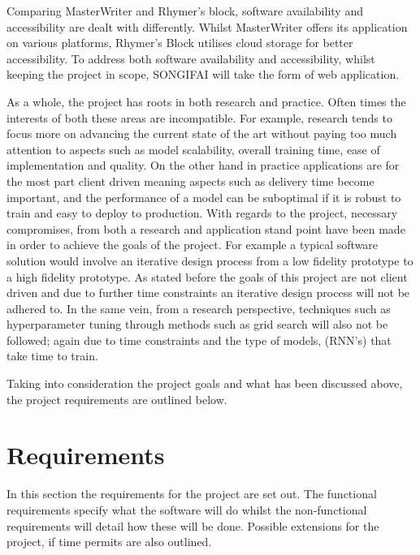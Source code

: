 \noindent
\newline
Comparing MasterWriter and Rhymer's block, software availability and accessibility are dealt with differently. Whilst MasterWriter offers its application on various platforms, Rhymer's Block utilises cloud storage for better accessibility. To address both software availability and accessibility, whilst keeping the project in scope, SONGIFAI will take the form of web application.  

\noindent
\newline
As a whole, the project has roots in both research and practice. Often times the interests of both these areas are incompatible. For example, research tends to focus more on advancing the current state of the art without paying too much attention to aspects such as model scalability, overall training time, ease of implementation and quality. On the other hand in practice applications  are for the most part client driven meaning aspects such as delivery time become important, and the performance of a model can be suboptimal if it is robust to train and easy to deploy to production. With regards to the project, necessary compromises, from both a research and application stand point have been made in order to achieve the goals of the project. For example a typical software solution would involve an iterative design process from a low fidelity prototype to a high fidelity prototype. As stated before the goals of this project are not client driven and due to further time constraints an iterative design process will not be adhered to. In the same vein, from a research perspective, techniques such as hyperparameter tuning through methods such as grid search will also not be followed; again due to time constraints and the type of models, (RNN's) that take time to train.

\noindent 
\newline
Taking into consideration the project goals and what has been discussed above, the project requirements are outlined below.
\section{Requirements}
In this section the requirements for the project are set out. The functional requirements specify what the software will do whilst the non-functional requirements will detail how these will be done. Possible extensions for the project, if time permits are also outlined.
